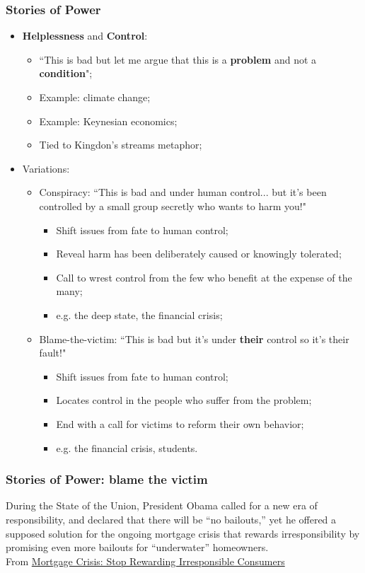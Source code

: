 \documentclass[aspectratio=169]{beamer}
\theoremstyle{principle}
\begin{document}
\begin{frame}
\frametitle{Stories of Power}
\begin{itemize}
\item \textbf{Helplessness} and \textbf{Control}:
\begin{itemize}
\item ``This is bad but let me argue that this is a \textbf{problem} and not a \textbf{condition}";
\item Example: climate change;
\item Example: Keynesian economics;
\item Tied to Kingdon's streams metaphor;
\end{itemize}
\bigskip
\item Variations:
\begin{itemize}
\item Conspiracy: ``This is bad and under human control... but it's been controlled by a small group secretly who wants to harm you!"
\begin{itemize}
\item Shift issues from fate to human control;
\item Reveal harm has been deliberately caused or knowingly tolerated;
\item Call to wrest control from the few who benefit at the expense of the many;
\item e.g. the deep state, the financial crisis;
\end{itemize}
\bigskip
\item Blame-the-victim: ``This is bad but it's under \textbf{their} control so it's their fault!"
\begin{itemize}
\item Shift issues from fate to human control;
\item Locates control in the people who suffer from the problem;
\item End with a call for victims to reform their own behavior;
\item e.g. the financial crisis, students.
\end{itemize}
\end{itemize}
\end{itemize}
\end{frame}

\begin{frame}
\frametitle{Stories of Power: blame the victim}
\begin{center}
During the State of the Union, President Obama called for a new era of responsibility, and declared that there will be ``no bailouts,” yet he offered a supposed solution for the ongoing mortgage crisis that rewards irresponsibility by promising even more bailouts for ``underwater” homeowners.\\
\bigskip
From \href{https://www.nytimes.com/roomfordebate/2012/01/25/is-refinancing-the-best-way-to-fix-the-housing-market/mortgage-crisis-stop-rewarding-irresponsible-consumers}{Mortgage Crisis: Stop Rewarding Irresponsible Consumers}
\end{center}
\end{frame}
\end{document}
